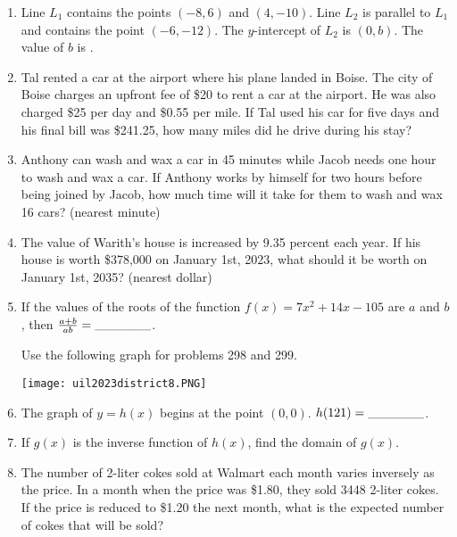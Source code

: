 \documentclass[../uilmath.tex]{subfiles}
\begin{document}
\begin{enumerate}[label=\bfseries\arabic*.]
        \item %
        Line $L_1$ contains the points $(-8,6)$ and $(4,-10)$. Line $L_2$ is parallel to $L_1$ and contains the point $(-6,-12)$. The $y$-intercept of $L_2$ is $(0,b)$. The value of $b$ is \blank .

        \item %
        Tal rented a car at the airport where his plane landed in Boise. The city of Boise charges an upfront fee of \$20 to rent a car at the airport. He was also 
        charged \$25 per day and \$0.55 per mile. If Tal used his car for five days and his final bill was \$241.25, how many miles did he drive during his stay?

        \item %
        Anthony can wash and wax a car in 45 minutes while Jacob needs one hour to wash and wax a car. If Anthony works by himself for two hours before 
        being joined by Jacob, how much time will it take for them to wash and wax 16 cars? (nearest minute)

        \item %
        The value of Warith's house is increased by 9.35 percent each year. If his house is worth \$378,000 on January 1st, 2023, 
        what should it be worth on January 1st, 2035? (nearest dollar)

        \item %
        If the values of the roots of the function $f(x)=7x^2+14x-105$ are $a$ and $b$, then $\frac{a+b}{ab}=\_\_\_\_\_\_$.


        Use the following graph for problems 298 and 299.
        \begin{center}
            \texttt{[image: uil2023district8.PNG]}
        \end{center}
        \item %
        The graph of $y=h(x)$ begins at the point $(0,0)$. $h(121)=\_\_\_\_\_\_$.

        \item %
        If $g(x)$ is the inverse function of $h(x)$, find the domain of $g(x)$.

        \item %
        The number of 2-liter cokes sold at Walmart each month varies inversely as the price. In a month when the price was 
        \$1.80, they sold 3448 2-liter cokes. If the price is reduced to \$1.20 the next month, what is the expected number of cokes that will be sold?


\end{enumerate}
\end{document}
